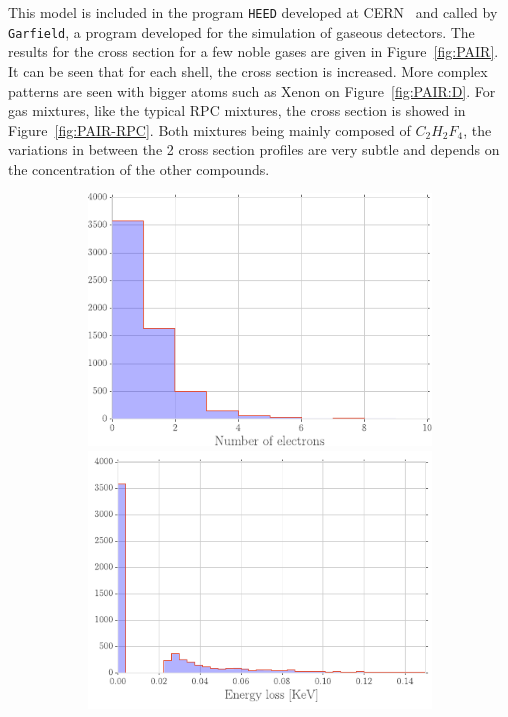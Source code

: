 	This model is included in the program \texttt{HEED} developed at CERN~\cite{HEED} and called by \texttt{Garfield}, a program developed for the simulation of gaseous detectors. The results for the cross section for a few noble gases are given in Figure~\ref{fig:PAIR}. It can be seen that for each shell, the cross section is increased. More complex patterns are seen with bigger atoms such as Xenon on Figure~\ref{fig:PAIR:D}. For gas mixtures, like the typical RPC mixtures, the cross section is showed in Figure~\ref{fig:PAIR-RPC}. Both mixtures being mainly composed of $C_2H_2F_4$, the variations in between the 2 cross section profiles are very subtle and depends on the concentration of the other compounds.
	
	\begin{figure}[H]
		\begin{subfigure}{\linewidth}
			\centering
			\includegraphics[width = 0.5\plotwidth]{fig/chapt4/N_elec_Helium.pdf}
			\includegraphics[width = 0.5\plotwidth]{fig/chapt4/E_loss_Helium.pdf}

\end{subfigure}
\end{figure}
